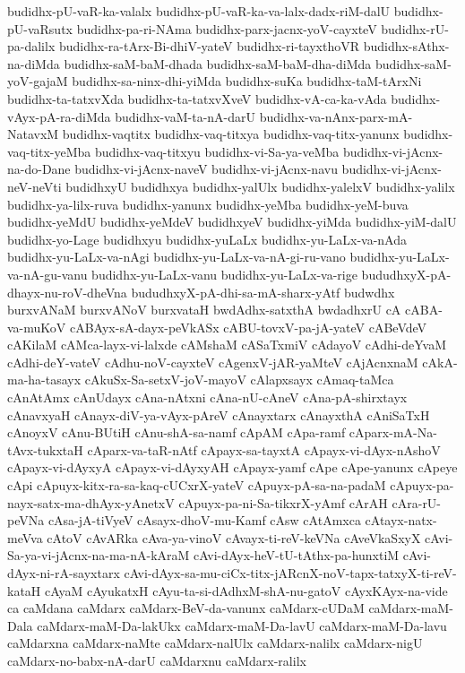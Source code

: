 {budidhx-pU-vaR-ka-valalx
budidhx-pU-vaR-ka-va-lalx-dadx-riM-dalU
budidhx-pU-vaRsutx
budidhx-pa-ri-NAma
budidhx-parx-jacnx-yoV-cayxteV
budidhx-rU-pa-dalilx
budidhx-ra-tArx-Bi-dhiV-yateV
budidhx-ri-tayxthoVR
budidhx-sAthx-na-diMda
budidhx-saM-baM-dhada
budidhx-saM-baM-dha-diMda
budidhx-saM-yoV-gajaM
budidhx-sa-ninx-dhi-yiMda
budidhx-suKa
budidhx-taM-tArxNi
budidhx-ta-tatxvXda
budidhx-ta-tatxvXveV
budidhx-vA-ca-ka-vAda
budidhx-vAyx-pA-ra-diMda
budidhx-vaM-ta-nA-darU
budidhx-va-nAnx-parx-mA-NatavxM
budidhx-vaqtitx
budidhx-vaq-titxya
budidhx-vaq-titx-yanunx
budidhx-vaq-titx-yeMba
budidhx-vaq-titxyu
budidhx-vi-Sa-ya-veMba
budidhx-vi-jAcnx-na-do-Dane
budidhx-vi-jAcnx-naveV
budidhx-vi-jAcnx-navu
budidhx-vi-jAcnx-neV-neVti
budidhxyU
budidhxya
budidhx-yalUlx
budidhx-yalelxV
budidhx-yalilx
budidhx-ya-lilx-ruva
budidhx-yanunx
budidhx-yeMba
budidhx-yeM-buva
budidhx-yeMdU
budidhx-yeMdeV
budidhxyeV
budidhx-yiMda
budidhx-yiM-dalU
budidhx-yo-Lage
budidhxyu
budidhx-yuLaLx
budidhx-yu-LaLx-va-nAda
budidhx-yu-LaLx-va-nAgi
budidhx-yu-LaLx-va-nA-gi-ru-vano
budidhx-yu-LaLx-va-nA-gu-vanu
budidhx-yu-LaLx-vanu
budidhx-yu-LaLx-va-rige
bududhxyX-pA-dhayx-nu-roV-dheVna
bududhxyX-pA-dhi-sa-mA-sharx-yAtf
budwdhx
burxvANaM
burxvANoV
burxvataH
bwdAdhx-satxthA
bwdadhxrU
cA
cABA-va-muKoV
cABAyx-sA-dayx-peVkASx
cABU-tovxV-pa-jA-yateV
cABeVdeV
cAKilaM
cAMca-layx-vi-lalxde
cAMshaM
cASaTxmiV
cAdayoV
cAdhi-deYvaM
cAdhi-deY-vateV
cAdhu-noV-cayxteV
cAgenxV-jAR-yaMteV
cAjAcnxnaM
cAkA-ma-ha-tasayx
cAkuSx-Sa-setxV-joV-mayoV
cAlapxsayx
cAmaq-taMca
cAnAtAmx
cAnUdayx
cAna-nAtxni
cAna-nU-cAneV
cAna-pA-shirxtayx
cAnavxyaH
cAnayx-diV-ya-vAyx-pAreV
cAnayxtarx
cAnayxthA
cAniSaTxH
cAnoyxV
cAnu-BUtiH
cAnu-shA-sa-namf
cApAM
cApa-ramf
cAparx-mA-Na-tAvx-tukxtaH
cAparx-va-taR-nAtf
cApayx-sa-tayxtA
cApayx-vi-dAyx-nAshoV
cApayx-vi-dAyxyA
cApayx-vi-dAyxyAH
cApayx-yamf
cApe
cApe-yanunx
cApeye
cApi
cApuyx-kitx-ra-sa-kaq-cUCxrX-yateV
cApuyx-pA-sa-na-padaM
cApuyx-pa-nayx-satx-ma-dhAyx-yAnetxV
cApuyx-pa-ni-Sa-tikxrX-yAmf
cArAH
cAra-rU-peVNa
cAsa-jA-tiVyeV
cAsayx-dhoV-mu-Kamf
cAsw
cAtAmxca
cAtayx-natx-meVva
cAtoV
cAvARka
cAva-ya-vinoV
cAvayx-ti-reV-keVNa
cAveVkaSxyX
cAvi-Sa-ya-vi-jAcnx-na-ma-nA-kAraM
cAvi-dAyx-heV-tU-tAthx-pa-hunxtiM
cAvi-dAyx-ni-rA-sayxtarx
cAvi-dAyx-sa-mu-ciCx-titx-jARcnX-noV-tapx-tatxyX-ti-reV-kataH
cAyaM
cAyukatxH
cAyu-ta-si-dAdhxM-shA-nu-gatoV
cAyxKAyx-na-vide
ca
caMdana
caMdarx
caMdarx-BeV-da-vanunx
caMdarx-cUDaM
caMdarx-maM-Dala
caMdarx-maM-Da-lakUkx
caMdarx-maM-Da-lavU
caMdarx-maM-Da-lavu
caMdarxna
caMdarx-naMte
caMdarx-nalUlx
caMdarx-nalilx
caMdarx-nigU
caMdarx-no-babx-nA-darU
caMdarxnu
caMdarx-ralilx
}
